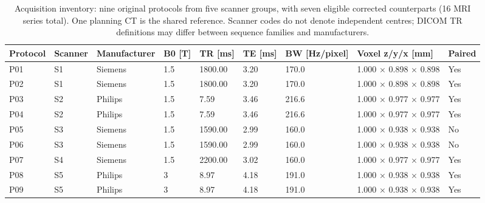 \begin{table}
\caption{Acquisition inventory: nine original protocols from five scanner groups, with seven eligible corrected counterparts (16 MRI series total). One planning CT is the shared reference. Scanner codes do not denote independent centres; DICOM TR definitions may differ between sequence families and manufacturers.}
\centering
\begin{tabular}{lllllllll}
\hline
Protocol & Scanner & Manufacturer & B0 [T] & TR [ms] & TE [ms] & BW [Hz/pixel] & Voxel z/y/x [mm] & Paired \\
\hline
P01 & S1 & Siemens & 1.5 & 1800.00 & 3.20 & 170.0 & 1.000 × 0.898 × 0.898 & Yes \\
P02 & S1 & Siemens & 1.5 & 1800.00 & 3.20 & 170.0 & 1.000 × 0.898 × 0.898 & Yes \\
P03 & S2 & Philips & 1.5 & 7.59 & 3.46 & 216.6 & 1.000 × 0.977 × 0.977 & Yes \\
P04 & S2 & Philips & 1.5 & 7.59 & 3.46 & 216.6 & 1.000 × 0.977 × 0.977 & Yes \\
P05 & S3 & Siemens & 1.5 & 1590.00 & 2.99 & 160.0 & 1.000 × 0.938 × 0.938 & No \\
P06 & S3 & Siemens & 1.5 & 1590.00 & 2.99 & 160.0 & 1.000 × 0.938 × 0.938 & No \\
P07 & S4 & Siemens & 1.5 & 2200.00 & 3.02 & 160.0 & 1.000 × 0.977 × 0.977 & Yes \\
P08 & S5 & Philips & 3 & 8.97 & 4.18 & 191.0 & 1.000 × 0.938 × 0.938 & Yes \\
P09 & S5 & Philips & 3 & 8.97 & 4.18 & 191.0 & 1.000 × 0.938 × 0.938 & Yes \\
\hline
\end{tabular}
\end{table}
